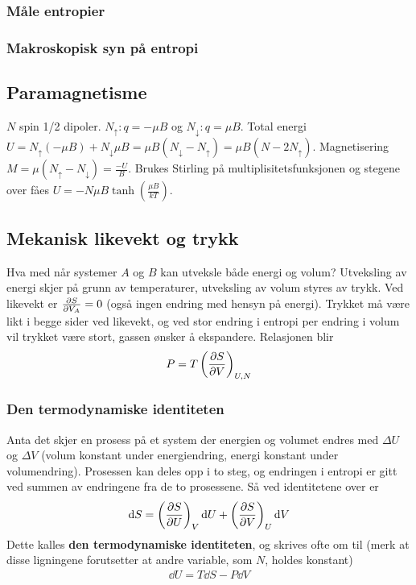 \documentclass[12pt]{article}
\begin{document}
\subsubsection{Måle entropier}
\subsubsection{Makroskopisk syn på entropi}
\subsection{Paramagnetisme}
$N$ spin 1/2 dipoler. $N_\uparrow: q = -\mu B$ og $N_\downarrow: q = \mu B$.
Total energi $U = N_\uparrow(-\mu B) + N_\downarrow \mu B = \mu B(N_\downarrow - N_\uparrow) = \mu B(N - 2N_\uparrow)$.
Magnetisering $M = \mu(N_\uparrow - N_\downarrow) = \frac{-U}{B}$. Brukes Stirling
på multiplisitetsfunksjonen og stegene over fåes $U = -N\mu B\tanh{\left(\frac{\mu B}{kT} \right)}$.
\subsection{Mekanisk likevekt og trykk}
Hva med når systemer $A$ og $B$ kan utveksle både energi og volum? Utveksling av
energi skjer på grunn av temperaturer, utveksling av volum styres av trykk.
Ved likevekt er $\pdv{S}{V_A} = 0$ (også ingen endring med hensyn på energi). Trykket
må være likt i begge sider ved likevekt, og ved stor endring i entropi per endring i
volum vil trykket være stort, gassen ønsker å ekspandere. Relasjonen blir
\begin{align*}
  P = T \left( \pdv{S}{V} \right)_{U,N}
\end{align*}
\subsubsection{Den termodynamiske identiteten}
Anta det skjer en prosess på et system der energien og volumet endres med $\Delta U$
og $\Delta V$ (volum konstant under energiendring, energi konstant under volumendring).
Prosessen kan deles opp i to steg, og endringen i entropi er gitt ved summen av
endringene fra de to prosessene. Så ved identitetene over er
\begin{align*}
  \dd S = \left( \pdv{S}{U} \right)_{V} \dd U + \left( \pdv{S}{V} \right)_{U}\dd V
\end{align*}
Dette kalles \textbf{den termodynamiske identiteten}, og skrives ofte om til (merk
at disse ligningene forutsetter at andre variable, som $N$, holdes konstant)
\begin{align*}
  \dd U = T \dd S - P \dd V
\end{align*}
\end{document}
